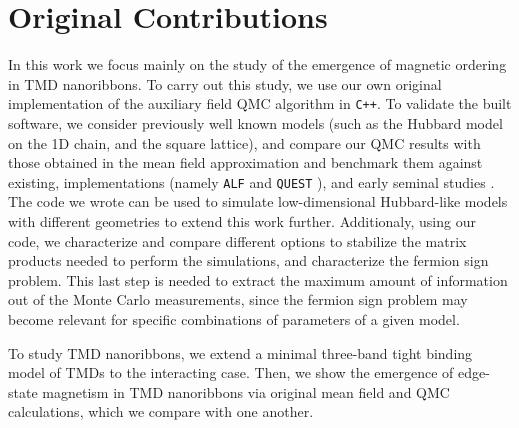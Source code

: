 \section{Original Contributions}
\label{sec:int_contributions}

In this work we focus mainly on the study of the emergence of magnetic ordering in \ac{TMD} nanoribbons.
To carry out this study, we use our own original implementation of the auxiliary field \ac{QMC} algorithm in \texttt{C++}.
To validate the built software, we consider previously well known models (such as the Hubbard model on the \acs{1D} chain, and the square lattice), and compare our \ac{QMC} results with those obtained in the mean field approximation and benchmark them against existing,   implementations (namely \texttt{ALF} \cite{bercx_alf_2017} and \texttt{QUEST} \cite{noauthor_quest_2012}), and early seminal studies \cite{hirsch_discrete_1983,white_numerical_1989}.
The code we wrote can be used to simulate low-dimensional Hubbard-like models with different geometries to extend this work further.
Additionaly, using our code, we characterize and compare different options to stabilize the matrix products needed to perform the simulations, and characterize the fermion sign problem.
This last step is needed to extract the maximum amount of information out of the Monte Carlo measurements, since the fermion sign problem may become relevant for specific combinations of parameters of a given model.

To study \ac{TMD} nanoribbons, we extend a minimal three-band tight binding model \cite{liu_three-band_2013} of \acp{TMD} to the interacting case.
Then, we show the emergence of edge-state magnetism in \ac{TMD} nanoribbons via original mean field and \ac{QMC} calculations, which we compare with one another.